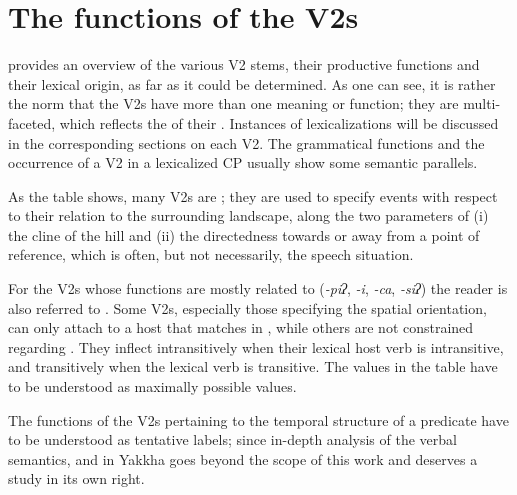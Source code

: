 \section{The functions of the V2s}\label{verb-verb-functional}

 provides an overview of the various V2 stems, their productive functions and their lexical origin, as far as it could be determined. As one can see, it is rather the norm that the V2s have more than one meaning or function; they are multi-faceted, which reflects the  of their . Instances of lexicalizations will be discussed in the corresponding sections on each V2. The grammatical functions and the occurrence of a V2 in a lexicalized CP usually show some semantic parallels. 

As the table shows, many V2s are ; they are used to specify events with respect to their  relation to the surrounding landscape, along the two para\-meters of (i) the cline of the hill and (ii) the directedness towards or away from a point of reference, which is often, but not necessarily, the speech situation. 

For the V2s whose functions are mostly related to  (\emph{-piʔ}, \emph{-i}, \emph{-ca}, \emph{-siʔ}) the reader is also referred to . Some V2s, especially those specifying the spatial  orientation,  can  only attach to a host that matches in , while others are not constrained regarding . They inflect intransitively when their lexical host  verb is intransitive, and transitively when the lexical verb is transitive. The  values in the table have to be understood as maximally possible values.

The functions of the V2s pertaining to the temporal structure of a predicate have to be understood as tentative labels; since in-depth analysis of the verbal semantics,  and  in Yakkha goes beyond the scope of this work and deserves a study in its own right.






